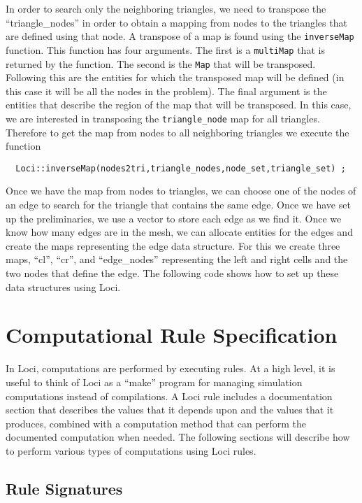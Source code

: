 \documentclass[10pt,epsf]{book}
\begin{document}
In order to search only the neighboring triangles, we need to
transpose the ``triangle\_nodes'' in order to obtain a mapping from
nodes to the triangles that are defined using that node.  A transpose
of a map is found using the {\tt inverseMap} function.  This function has
four arguments.  The first is a {\tt multiMap} that is returned by the
function.  The second is the {\tt Map} that will be transposed.
Following this are the entities for which the transposed map will be
defined (in this case it will be all the nodes in the problem).  The
final argument is the entities that describe the region of the map
that will be transposed.  In this case, we are interested in
transposing the {\tt triangle\_node} map for all triangles.  Therefore
to get the map from nodes to all neighboring triangles we execute the
function 
\begin{verbatim}
  Loci::inverseMap(nodes2tri,triangle_nodes,node_set,triangle_set) ;
\end{verbatim}

Once we have the map from nodes to triangles, we can choose one of the
nodes of an edge to search for the triangle that contains the same
edge.  Once we have set up the preliminaries, we use a vector to store
each edge as we find it.  Once we know how many edges are in the mesh,
we can allocate entities for the edges and create the maps
representing the edge data structure.  For this we create three maps,
``cl'', ``cr'', and ``edge\_nodes'' representing the left and right
cells and the two nodes that define the edge.  The following code
shows how to set up these data structures using Loci.



\chapter{Computational Rule Specification}

In Loci, computations are performed by executing rules.  At a high
level, it is useful to think of Loci as a ``make'' program for
managing simulation computations instead of compilations.  A Loci rule
includes a documentation section that describes the values that it
depends upon and the values that it produces, combined with a
computation method that can perform the documented computation when
needed.  The following sections will describe how to perform various
types of computations using Loci rules.

\section{Rule Signatures}
\end{document}
